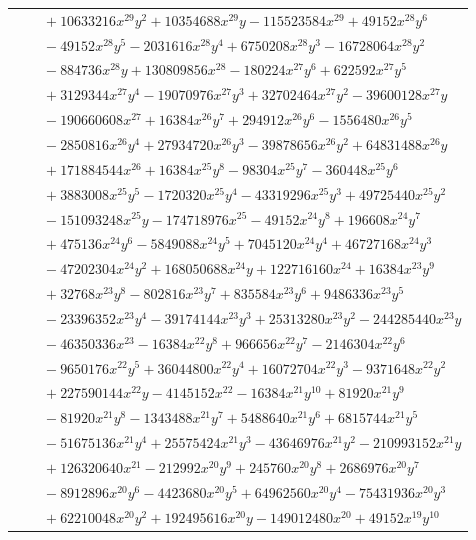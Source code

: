 \documentclass[11pt]{article}
\begin{document}
\begin{longtable}{@{}ll@{}}
 & $\quad +10633216x^{29}y^{2}+10354688x^{29}y-115523584x^{29}+49152x^{28}y^{6}$\\
 & $\quad -49152x^{28}y^{5}-2031616x^{28}y^{4}+6750208x^{28}y^{3}-16728064x^{28}y^{2}$\\
 & $\quad -884736x^{28}y+130809856x^{28}-180224x^{27}y^{6}+622592x^{27}y^{5}$\\
 & $\quad +3129344x^{27}y^{4}-19070976x^{27}y^{3}+32702464x^{27}y^{2}-39600128x^{27}y$\\
 & $\quad -190660608x^{27}+16384x^{26}y^{7}+294912x^{26}y^{6}-1556480x^{26}y^{5}$\\
 & $\quad -2850816x^{26}y^{4}+27934720x^{26}y^{3}-39878656x^{26}y^{2}+64831488x^{26}y$\\
 & $\quad +171884544x^{26}+16384x^{25}y^{8}-98304x^{25}y^{7}-360448x^{25}y^{6}$\\
 & $\quad +3883008x^{25}y^{5}-1720320x^{25}y^{4}-43319296x^{25}y^{3}+49725440x^{25}y^{2}$\\
 & $\quad -151093248x^{25}y-174718976x^{25}-49152x^{24}y^{8}+196608x^{24}y^{7}$\\
 & $\quad +475136x^{24}y^{6}-5849088x^{24}y^{5}+7045120x^{24}y^{4}+46727168x^{24}y^{3}$\\
 & $\quad -47202304x^{24}y^{2}+168050688x^{24}y+122716160x^{24}+16384x^{23}y^{9}$\\
 & $\quad +32768x^{23}y^{8}-802816x^{23}y^{7}+835584x^{23}y^{6}+9486336x^{23}y^{5}$\\
 & $\quad -23396352x^{23}y^{4}-39174144x^{23}y^{3}+25313280x^{23}y^{2}-244285440x^{23}y$\\
 & $\quad -46350336x^{23}-16384x^{22}y^{8}+966656x^{22}y^{7}-2146304x^{22}y^{6}$\\
 & $\quad -9650176x^{22}y^{5}+36044800x^{22}y^{4}+16072704x^{22}y^{3}-9371648x^{22}y^{2}$\\
 & $\quad +227590144x^{22}y-4145152x^{22}-16384x^{21}y^{10}+81920x^{21}y^{9}$\\
 & $\quad -81920x^{21}y^{8}-1343488x^{21}y^{7}+5488640x^{21}y^{6}+6815744x^{21}y^{5}$\\
 & $\quad -51675136x^{21}y^{4}+25575424x^{21}y^{3}-43646976x^{21}y^{2}-210993152x^{21}y$\\
 & $\quad +126320640x^{21}-212992x^{20}y^{9}+245760x^{20}y^{8}+2686976x^{20}y^{7}$\\
 & $\quad -8912896x^{20}y^{6}-4423680x^{20}y^{5}+64962560x^{20}y^{4}-75431936x^{20}y^{3}$\\
 & $\quad +62210048x^{20}y^{2}+192495616x^{20}y-149012480x^{20}+49152x^{19}y^{10}$\\

\end{longtable}
\end{document}
